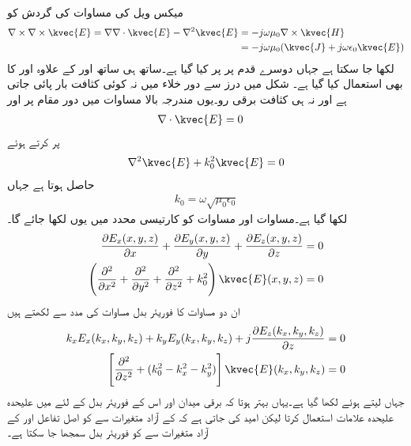 میکس ویل کی مساوات  کی گردش کو
\begin{align*}
\nabla \times \nabla \times \kvec{E}=\nabla \nabla \cdot \kvec{E}-\nabla^2 \kvec{E}&=-j \omega \mu_0 \nabla \times \kvec{H} \\
&=-j \omega \mu_0 (\kvec{J}+j \omega \epsilon_0 \kvec{E})
\end{align*}
لکھا جا سکتا ہے جہاں دوسرے قدم پر  پر کیا گیا ہے۔ساتھ ہی ساتھ  اور  کے علاوہ  اور 
 کا بھی استعمال کیا گیا ہے۔ شکل  میں درز سے دور خلاء میں نہ کوئی کثافت بار پائی جاتی ہے اور نہ ہی کثافت برقی رو۔یوں مندرجہ بالا مساوات میں دور مقام پر  اور  
\begin{align}\label{مساوات_اینٹینا_فوریئر_الف}
\nabla \cdot \kvec{E}&=0
\end{align}
پر کرتے ہوئے
\begin{align}\label{مساوات_اینٹینا_فوریئر_ب}
\nabla^2 \kvec{E}+k_0^2 \kvec{E}=0
\end{align}
حاصل ہوتا ہے جہاں
\begin{align}
k_0= \omega \sqrt{ \mu_0 \epsilon_0}
\end{align}
لکھا گیا ہے۔مساوات  اور مساوات  کو کارتیسی محدد میں یوں لکھا جائے گا۔
\begin{align}
\frac{\partial E_x(x,y,z)}{\partial x}+\frac{\partial E_y(x,y,z)}{\partial y}+\frac{\partial E_z(x,y,z)}{\partial z}&=0 \label{مساوات_اینٹینا_فوریئر_پ}\\
\left(\frac{\partial^2}{\partial x^2}+\frac{\partial^2}{\partial y^2}+\frac{\partial^2}{\partial z^2} +k_0^2\right) \kvec{E}(x,y,z)&=0\label{مساوات_اینٹینا_فوریئر_ت}
\end{align}
ان دو مساوات کا فوریئر بدل مساوات  کی مدد سے لکھتے ہیں
\begin{align}
k_x E_x(k_x,k_y,k_z)+k_y E_y(k_x,k_y,k_z)+j \frac{\partial E_z(k_x,k_y,k_z)}{\partial z}&=0\label{مساوات_اینٹینا_فوریئر_ٹ}\\
\left[\frac{\partial^2}{\partial z^2}+(k_0^2-k_x^2-k_y^2)\right] \kvec{E}(k_x,k_y,k_z)&=0\label{مساوات_اینٹینا_فوریئر_ث}
\end{align}
 جہاں  لیتے ہوئے  لکھا گیا ہے۔یہاں بہتر ہوتا کہ برقی میدان اور اس کے فوریئر بدل کے لئے میں علیحدہ علیحدہ علامات استعمال کرتا لیکن امید کی جاتی ہے کہ  کے آزاد متغیرات  سے  کو اصل تفاعل اور  کے آزاد متغیرات  سے    کو فوریئر بدل سمجھا جا سکتا ہے۔

